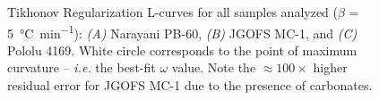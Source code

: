 \begin{figure}[p]
	\caption[Tikhonov Regularization L-curves for all samples analyzed]{Tikhonov Regularization L-curves for all samples analyzed ($\beta$ = \SI{5}{\celsius.min^{-1}}): \textit{(A)} Narayani PB-60, \textit{(B)} JGOFS MC-1, and \textit{(C)} Pololu 4169. White circle corresponds to the point of maximum curvature -- \textit{i.e.} the best-fit $\omega$ value. Note the $\approx 100 \times$ higher residual error for JGOFS MC-1 due to the presence of carbonates.}
	\label{Ch3Fig:6} 
\end{figure}

